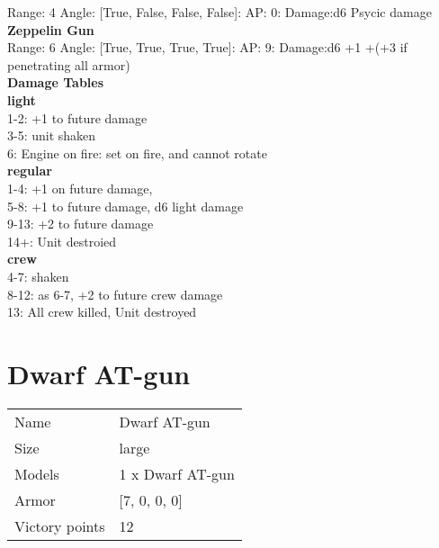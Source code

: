 Range: 4  Angle: [True, False, False, False]: AP: 0: Damage:d6 Psycic damage \\




{\bf Zeppelin Gun } \\



Range: 6  Angle: [True, True, True, True]: AP: 9: Damage:d6 +1 +(+3 if penetrating all armor) \\




 





{\bf Damage Tables} \\
 {\bf light } \\
1-2: +1 to future damage \\
3-5: unit shaken \\
6: Engine on fire: set on fire, and cannot rotate \\
 {\bf regular } \\
1-4: +1 on future damage, \\
5-8: +1 to future damage, d6 light damage \\
9-13: +2 to future damage \\
14+: Unit destroied \\
 {\bf crew } \\
4-7: shaken \\
8-12: as 6-7, +2 to future crew damage \\
13: All crew killed, Unit destroyed \\










\pagebreak\pagebreak

\section{ Dwarf AT-gun }

\begin{tabular}{ll}
  Name & Dwarf AT-gun \\
  Size & large\\
  Models & 1 x Dwarf AT-gun\\
  Armor & [7, 0, 0, 0]\\
  Victory points & 12\\
\end{tabular}

